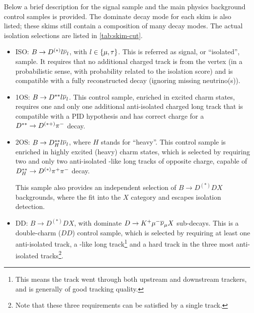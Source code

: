 Below a brief description for the signal sample and the main physics background
control samples is provided.
The dominate decay mode for each skim is also listed; these skims still contain
a composition of many decay modes.
The actual isolation selections are listed in \cref{tab:skim-cut}.

\begin{itemize}
    \item ISO: $B \rightarrow D^{(*)} {l} {{\overline{\nu}}_l}$, with ${l} \in \{{\mu},
        {\tau}\}$.
        This is referred as signal, or ``isolated'', sample.
        It requires that no additional charged track is from the \B vertex
        (in a probabilistic sense, with probability related to the isolation
        score)
        and is compatible with a fully reconstructed \B decay
        (ignoring missing neutrino(s)).

    \item 1OS: $B \rightarrow D^{**} {l} {{\overline{\nu}}_l}$.
        This control sample, enriched in excited charm states,
        requires one and only one additional anti-isolated charged long track
        that is compatible with a \pion PID hypothesis and has correct charge
        for a $D^{**} \rightarrow D^{(*+)}{{\pi}^-}$ decay.

    \item 2OS: $B \rightarrow D^{**}_H {l} {{\overline{\nu}}_l}$,
        where $H$ stands for ``heavy''.
        This control sample is enriched in highly excited (heavy) charm states,
        which is selected by requiring two and only two anti-isolated \pion-like
        long tracks of opposite charge,
        capable of $D^{**}_H \rightarrow D^{(*)} {{\pi}^+}{{\pi}^-}$ decay.

        This sample also provides an independent selection of
        $B \rightarrow D^{(*)}D X$ backgrounds, where the \pip\pim fit into the
        $X$ category and \kaon escapes isolation detection.

    \item DD: $B \rightarrow D^{(*)}D X$,
        with dominate $D \rightarrow {\ensuremath{{K}^+}} {\ensuremath{\mu^-}} {\ensuremath{{\overline{\nu}}_\mu}} X$ sub-decays.
        This is a double-charm ($DD$) control sample,
        which is selected by requiring at least one anti-isolated track,
        a \kaon-like long track\footnote{
            This means the track went through both upstream and downstream
            trackers, and is generally of good tracking quality.
        } and a hard track in the three most anti-isolated tracks\footnote{
            Note that these three requirements can be satisfied by a single
            track.
        }.
\end{itemize}

